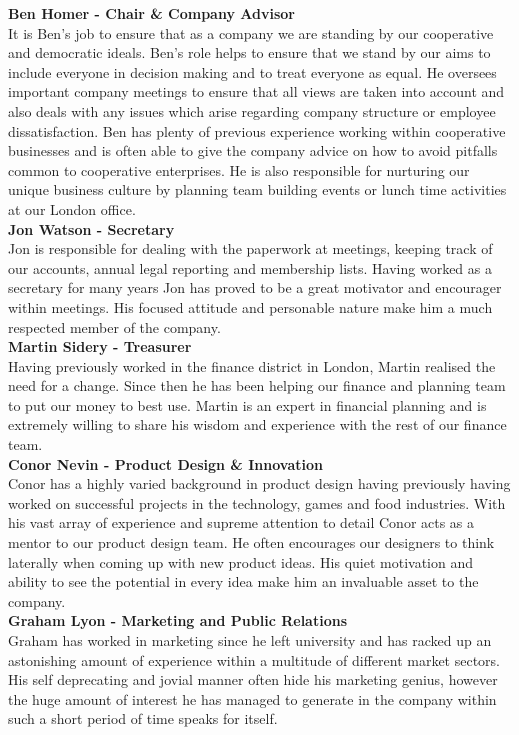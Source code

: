\documentclass{article}
\begin{document}
  {\bf Ben Homer - Chair \& Company Advisor} \\
  It is Ben's job to ensure that as a company we are standing by our cooperative and democratic ideals. Ben's role helps to ensure that we stand by our aims to include everyone in decision making and to treat everyone as equal. He oversees important company meetings to ensure that all views are taken into account and also deals with any issues which arise regarding company structure or employee dissatisfaction. Ben has plenty of previous experience working within cooperative businesses and is often able to give the company advice on how to avoid pitfalls common to cooperative enterprises. He is also responsible for nurturing our unique business culture by planning team building events or lunch time activities at our London office. \\
  
  {\bf Jon Watson - Secretary} \\
  Jon is responsible for dealing with the paperwork at meetings, keeping track of our accounts, annual legal reporting and membership lists. Having worked as a secretary for many years Jon has proved to be a great motivator and encourager within meetings. His focused attitude and personable nature make him a much respected member of the company. \\

  {\bf Martin Sidery - Treasurer} \\
  Having previously worked in the finance district in London, Martin realised the need for a change. Since then he has been helping our finance and planning team to put our money to best use. Martin is an expert in financial planning and is extremely willing to share his wisdom and experience with the rest of our finance team. \\
 
  {\bf Conor Nevin - Product Design \& Innovation} \\
  Conor has a highly varied background in product design having previously having worked on successful projects in the technology, games and food industries. With his vast array of experience and supreme attention to detail Conor acts as a mentor to our product design team. He often encourages our designers to think laterally when coming up with new product ideas. His quiet motivation and ability to see the potential in every idea make him an invaluable asset to the company. \\

  {\bf Graham Lyon - Marketing and Public Relations} \\
  Graham has worked in marketing since he left university and has racked up an astonishing amount of experience within a multitude of different market sectors. His self deprecating and jovial manner often hide his marketing genius, however the huge amount of interest he has managed to generate in the company within such a short period of time speaks for itself.
\end{document}

